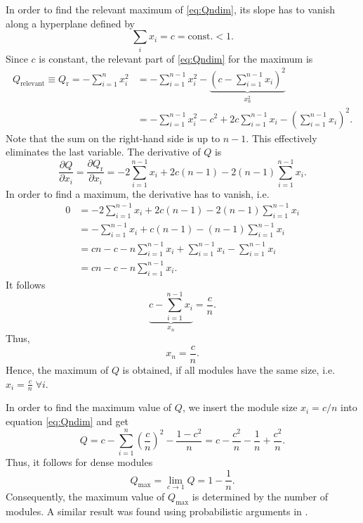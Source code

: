 In order to find the relevant maximum of \eqref{eq:Qndim}, its slope has to vanish along a hyperplane defined by
\begin{equation}\label{qmehrdimbedingung}
\sum _i x_i = c = \text{const.} <1.
\end{equation}
%
Since $c$ is constant, the relevant part of \eqref{eq:Qndim} for the maximum is
\begin{align}
Q_{\text{relevant}}\equiv Q_\text{r}= -\sum _{i=1}^n x_i^2&=-\sum _{i=1}^{n-1} x_i^2- \underbrace{ \left( 
c-\sum _{i=1}^{n-1} x_i \right) ^2 }_{x_n^2} \label{eq:relevant_Q}\\
&= -\sum _{i=1}^{n-1} x_i^2 - c^2 + 2c\sum _{i=1}^{n-1} x_i -\left( \sum _{i=1}^{n-1} x_i \right) ^2. \nonumber
\end{align}
Note that the sum on the right-hand side is up to $n-1$.
This effectively eliminates the last variable.
The derivative of $Q$ is
\begin{equation}
\frac{\partial Q}{\partial x_i}= \frac{\partial Q_\text{r}}{\partial x_i}=- 2\sum _{i=1}^{n-1} x_i + 2c(n-1)-2 (n-1) \sum _{i=1}^{n-1} x_i.
\end{equation}
%
In order to find a maximum, the derivative has to vanish, i.e.
\begin{align*}
0&=- 2\sum _{i=1}^{n-1} x_i + 2c(n-1)-2 (n-1) \sum _{i=1}^{n-1} x_i \\
&=- \sum _{i=1}^{n-1} x_i + c(n-1) - (n-1) \sum _{i=1}^{n-1} x_i \\
 &= cn-c-n\sum _{i=1}^{n-1} x_i +\sum _{i=1}^{n-1} x_i -\sum _{i=1}^{n-1} x_i\\
 &= cn-c-n\sum _{i=1}^{n-1} x_i .
\end{align*}
It follows
\[
\underbrace{c-\sum _{i=1}^{n-1} x_i}_{x_n} =\frac{c}{n}.
\]
Thus,
\begin{equation}
x_n=\frac{c}{n}.
\end{equation}
Hence, the maximum of $Q$ is obtained, if all modules have the same size, i.e. $x_i=\frac{c}{n} \; \forall i$.

In order to find the maximum value of $Q$, we insert the module size $x_i=c/n$ into equation \eqref{eq:Qndim} and get
\[
Q=c-\sum _{i=1} ^n \left( \frac{c}{n} \right) ^2 - \frac{1-c^2}{n}=c-\frac{c^2}{n}-\frac{1}{n}+\frac{c^2}{n}.
\]
Thus, it follows for dense modules
\begin{equation}\label{eq:q_max}
Q_\mathrm{max}= \lim _{c\rightarrow 1}Q=1-\frac{1}{n}.
\end{equation}
Consequently, the maximum value of $Q_\mathrm{max}$ is determined by the number of modules.
A similar result was found using probabilistic arguments in \citep{Good2010}.

